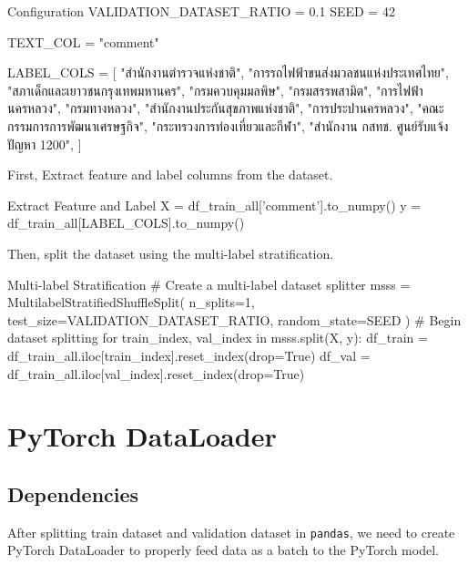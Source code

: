 \documentclass[12pt, a4paper]{article}
\begin{document}
            \begin{codeblock}{Configuration}
                VALIDATION_DATASET_RATIO = 0.1
                SEED = 42

                TEXT_COL = "comment"

                LABEL_COLS = [
                    "สำนักงานตำรวจแห่งชาติ",
                    "การรถไฟฟ้าขนส่งมวลชนแห่งประเทศไทย",
                    "สภาเด็กและเยาวชนกรุงเทพมหานคร",
                    "กรมควบคุมมลพิษ",
                    "กรมสรรพสามิต",
                    "การไฟฟ้านครหลวง",
                    "กรมทางหลวง",
                    "สำนักงานประกันสุขภาพแห่งชาติ",
                    "การประปานครหลวง",
                    "คณะกรรมการการพัฒนาเศรษฐกิจ",
                    "กระทรวงการท่องเที่ยวและกีฬา",
                    "สำนักงาน กสทช. ศูนย์รับแจ้งปัญหา 1200",
                ]
            \end{codeblock}

            \noindent First, Extract feature and label columns from the dataset.
            \begin{codeblock}{Extract Feature and Label}
                X = df_train_all['comment'].to_numpy()
                y = df_train_all[LABEL_COLS].to_numpy()
            \end{codeblock}

            \noindent Then, split the dataset using the multi-label stratification.
            \begin{codeblock}{Multi-label Stratification}
                # Create a multi-label dataset splitter
                msss = MultilabelStratifiedShuffleSplit(
                    n_splits=1,
                    test_size=VALIDATION_DATASET_RATIO,
                    random_state=SEED
                )
                # Begin dataset splitting
                for train_index, val_index in msss.split(X, y):
                    df_train = df_train_all.iloc[train_index].reset_index(drop=True)
                    df_val = df_train_all.iloc[val_index].reset_index(drop=True)
            \end{codeblock}

    \pagebreak

        \section{PyTorch DataLoader}
            \subsection{Dependencies}
                After splitting train dataset and validation dataset in \texttt{pandas},
                we need to create PyTorch DataLoader to properly feed data as a batch to the PyTorch model.
\end{document}
